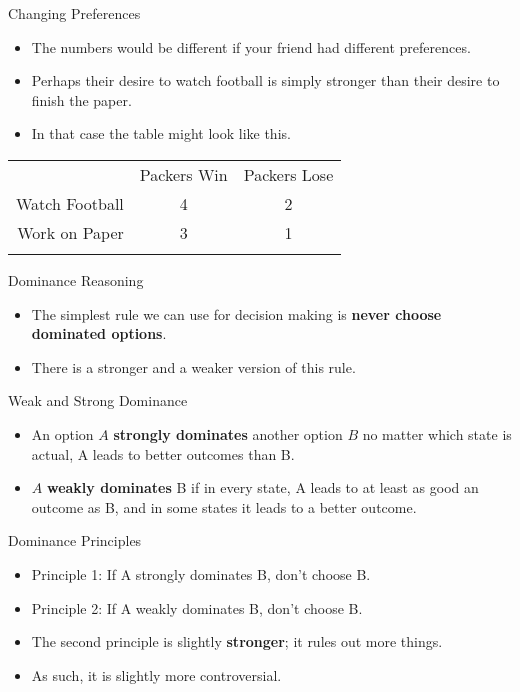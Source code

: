 \documentclass[
  ignorenonframetext,
]{beamer}
\providecommand{\tightlist}{%
  \setlength{\itemsep}{0pt}\setlength{\parskip}{0pt}}
\renewcommand{\,}{\text{, }}
\begin{document}
\begin{frame}{Changing Preferences}
\protect\hypertarget{changing-preferences}{}
\begin{itemize}
\tightlist
\item
  The numbers would be different if your friend had different
  preferences.
\item
  Perhaps their desire to watch football is simply stronger than their
  desire to finish the paper.
\item
  In that case the table might look like this.
\end{itemize}

\begin{longtable}[]{@{}rcc@{}}
\toprule
& Packers Win & Packers Lose \\ \addlinespace
\midrule
\endhead
Watch Football & 4 & 2 \\ \addlinespace
Work on Paper & 3 & 1 \\ \addlinespace
\bottomrule
\end{longtable}
\end{frame}

\begin{frame}{Dominance Reasoning}
\protect\hypertarget{dominance-reasoning}{}
\begin{itemize}
\tightlist
\item
  The simplest rule we can use for decision making is \textbf{never
  choose dominated options}.
\item
  There is a stronger and a weaker version of this rule.
\end{itemize}
\end{frame}

\begin{frame}{Weak and Strong Dominance}
\protect\hypertarget{weak-and-strong-dominance}{}
\begin{itemize}
\tightlist
\item
  An option \(A\) \textbf{strongly dominates} another option \(B\) no
  matter which state is actual, A leads to better outcomes than B.
  \pause 
\item
  \(A\) \textbf{weakly dominates} B if in every state, A leads to at
  least as good an outcome as B, and in some states it leads to a better
  outcome.
\end{itemize}
\end{frame}

\begin{frame}{Dominance Principles}
\protect\hypertarget{dominance-principles}{}
\begin{itemize}
\tightlist
\item
  Principle 1: If A strongly dominates B, don't choose B.
\item
  Principle 2: If A weakly dominates B, don't choose B.
\item
  The second principle is slightly \textbf{stronger}; it rules out more
  things.
\item
  As such, it is slightly more controversial.
\end{itemize}
\end{frame}
\end{document}
